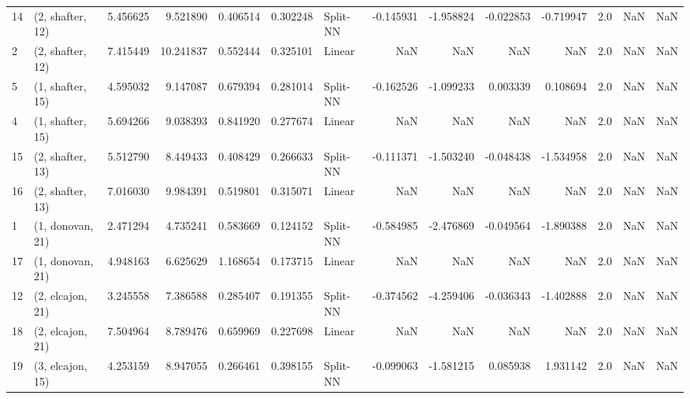 \begin{tabular}{llrrrrlrrrrrrl}
14 &  (2, shafter, 12) &   5.456625 &   9.521890 &   0.406514 &  0.302248 &    Split-NN &       -0.145931 &     -1.958824 &      -0.022853 &    -0.719947 &            2.0 &    NaN &              NaN \\
2  &  (2, shafter, 12) &   7.415449 &  10.241837 &   0.552444 &  0.325101 &      Linear &             NaN &           NaN &            NaN &          NaN &            2.0 &    NaN &              NaN \\
5  &  (1, shafter, 15) &   4.595032 &   9.147087 &   0.679394 &  0.281014 &    Split-NN &       -0.162526 &     -1.099233 &       0.003339 &     0.108694 &            2.0 &    NaN &              NaN \\
4  &  (1, shafter, 15) &   5.694266 &   9.038393 &   0.841920 &  0.277674 &      Linear &             NaN &           NaN &            NaN &          NaN &            2.0 &    NaN &              NaN \\
15 &  (2, shafter, 13) &   5.512790 &   8.449433 &   0.408429 &  0.266633 &    Split-NN &       -0.111371 &     -1.503240 &      -0.048438 &    -1.534958 &            2.0 &    NaN &              NaN \\
16 &  (2, shafter, 13) &   7.016030 &   9.984391 &   0.519801 &  0.315071 &      Linear &             NaN &           NaN &            NaN &          NaN &            2.0 &    NaN &              NaN \\
1  &  (1, donovan, 21) &   2.471294 &   4.735241 &   0.583669 &  0.124152 &    Split-NN &       -0.584985 &     -2.476869 &      -0.049564 &    -1.890388 &            2.0 &    NaN &              NaN \\
17 &  (1, donovan, 21) &   4.948163 &   6.625629 &   1.168654 &  0.173715 &      Linear &             NaN &           NaN &            NaN &          NaN &            2.0 &    NaN &              NaN \\
12 &  (2, elcajon, 21) &   3.245558 &   7.386588 &   0.285407 &  0.191355 &    Split-NN &       -0.374562 &     -4.259406 &      -0.036343 &    -1.402888 &            2.0 &    NaN &              NaN \\
18 &  (2, elcajon, 21) &   7.504964 &   8.789476 &   0.659969 &  0.227698 &      Linear &             NaN &           NaN &            NaN &          NaN &            2.0 &    NaN &              NaN \\
19 &  (3, elcajon, 15) &   4.253159 &   8.947055 &   0.266461 &  0.398155 &    Split-NN &       -0.099063 &     -1.581215 &       0.085938 &     1.931142 &            2.0 &    NaN &              NaN \\

\end{tabular}
